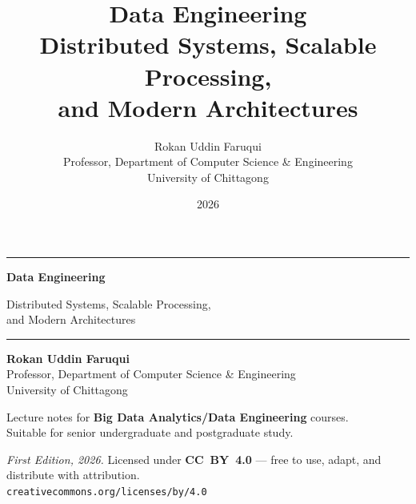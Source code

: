 \documentclass[11pt,b5paper,twoside,openright]{book}
\title{%
  \vspace{-1cm}
  {\sffamily\Huge\bfseries\color{DEBlue} Data Engineering}\\[10pt]
  {\sffamily\Large\color{DEBlue!70}
    Distributed Systems, Scalable Processing,\\[4pt]
    and Modern Architectures}
}
\author{Rokan Uddin Faruqui\\[6pt]
  \normalsize Professor, Department of Computer Science \& Engineering\\
  \normalsize University of Chittagong
}
\date{2026}
\begin{document}

\frontmatter


%

\cleardoublepage
\thispagestyle{empty}
\begin{center}
  \vspace*{2.2cm}

  {\color{DEBlue}\rule{\textwidth}{1.5pt}}
  \vspace{0.5cm}

  {\sffamily\Huge\bfseries\color{DEBlue} Data Engineering}

  \vspace{0.35cm}

  {\sffamily\Large\color{DEBlue!75}
    Distributed Systems, Scalable Processing,\\[4pt]
    and Modern Architectures}

  \vspace{0.35cm}
  {\color{DEBlue}\rule{\textwidth}{1.5pt}}

  \vspace{1.4cm}

  {\sffamily\large\bfseries \sc Rokan Uddin Faruqui}\\[5pt]
  {\sffamily\small Professor, Department of Computer Science \& Engineering}\\[2pt]
  {\sffamily\small University of Chittagong}

  \vspace{1.2cm}

  {\sffamily\small\color{DEGray}
    Lecture notes for \textbf{Big Data Analytics/Data Engineering} courses.\\[3pt] 
    Suitable for senior undergraduate and postgraduate study.}

  \vfill

  \noindent{\color{DEBlue!30}\rule{\textwidth}{0.6pt}}
  \vspace{0.35cm}

  {\sffamily\small\color{DEGray}
    \textit{First Edition, 2026.}\quad
    Licensed under \textbf{CC~BY~4.0} ---
    free to use, adapt, and distribute with attribution.\\[3pt]
    \texttt{creativecommons.org/licenses/by/4.0}}

  \vspace{0.4cm}
\end{center}
\end{document}
